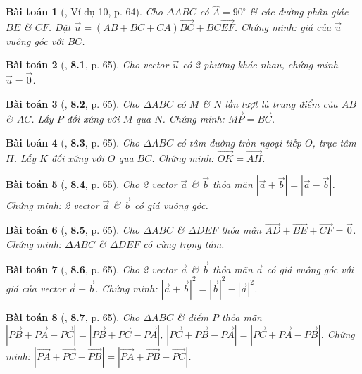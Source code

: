 \documentclass{article}
\numberwithin{equation}{section}
\newtheorem{baitoan}{Bài toán}[section]
\begin{document}
\begin{baitoan}[\cite{Hai_Hung_Thu_Tung2022_tap_1}, Ví dụ 10, p. 64]
	Cho $\Delta ABC$ có $\widehat{A} = 90^\circ$ \& các đường phân giác $BE$ \& $CF$. Đặt $\vec{u} = (AB + BC + CA)\overrightarrow{BC} + BC\overrightarrow{EF}$. Chứng minh: giá của $\vec{u}$ vuông góc với $BC$.
\end{baitoan}

\begin{baitoan}[\cite{Hai_Hung_Thu_Tung2022_tap_1}, \textbf{8.1}, p. 65]
	Cho vector $\vec{u}$ có 2 phương khác nhau, chứng minh $\vec{u} = \vec{0}$.
\end{baitoan}

\begin{baitoan}[\cite{Hai_Hung_Thu_Tung2022_tap_1}, \textbf{8.2}, p. 65]
	Cho $\Delta ABC$ có $M$ \& $N$ lần lượt là trung điểm của $AB$ \& $AC$. Lấy $P$ đối xứng với $M$ qua $N$. Chứng minh: $\overrightarrow{MP} = \overrightarrow{BC}$.
\end{baitoan}

\begin{baitoan}[\cite{Hai_Hung_Thu_Tung2022_tap_1}, \textbf{8.3}, p. 65]
	Cho $\Delta ABC$ có tâm đường tròn ngoại tiếp $O$, trực tâm $H$. Lấy $K$ đối xứng với $O$ qua $BC$. Chứng minh: $\overrightarrow{OK} = \overrightarrow{AH}$.
\end{baitoan}

\begin{baitoan}[\cite{Hai_Hung_Thu_Tung2022_tap_1}, \textbf{8.4}, p. 65]
	Cho 2 vector $\vec{a}$ \& $\vec{b}$ thỏa mãn $|\vec{a} + \vec{b}| = |\vec{a} - \vec{b}|$. Chứng minh: 2 vector $\vec{a}$ \& $\vec{b}$ có giá vuông góc.
\end{baitoan}

\begin{baitoan}[\cite{Hai_Hung_Thu_Tung2022_tap_1}, \textbf{8.5}, p. 65]
	Cho $\Delta ABC$ \& $\Delta DEF$ thỏa mãn $\overrightarrow{AD} + \overrightarrow{BE} + \overrightarrow{CF} = \vec{0}$. Chứng minh: $\Delta ABC$ \& $\Delta DEF$ có cùng trọng tâm.
\end{baitoan}

\begin{baitoan}[\cite{Hai_Hung_Thu_Tung2022_tap_1}, \textbf{8.6}, p. 65]
	Cho 2 vector $\vec{a}$ \& $\vec{b}$ thỏa mãn $\vec{a}$ có giá vuông góc với giá của vector $\vec{a} + \vec{b}$. Chứng minh: $|\vec{a} + \vec{b}|^2 = |\vec{b}|^2 - |\vec{a}|^2$.
\end{baitoan}

\begin{baitoan}[\cite{Hai_Hung_Thu_Tung2022_tap_1}, \textbf{8.7}, p. 65]
	Cho $\Delta ABC$ \& điểm $P$ thỏa mãn $|\overrightarrow{PB} + \overrightarrow{PA} - \overrightarrow{PC}| = |\overrightarrow{PB} + \overrightarrow{PC} - \overrightarrow{PA}|$, $|\overrightarrow{PC} + \overrightarrow{PB} - \overrightarrow{PA}| = |\overrightarrow{PC} + \overrightarrow{PA} - \overrightarrow{PB}|$. Chứng minh: $|\overrightarrow{PA} + \overrightarrow{PC} - \overrightarrow{PB}| = |\overrightarrow{PA} + \overrightarrow{PB} - \overrightarrow{PC}|$.
\end{baitoan}
\end{document}
